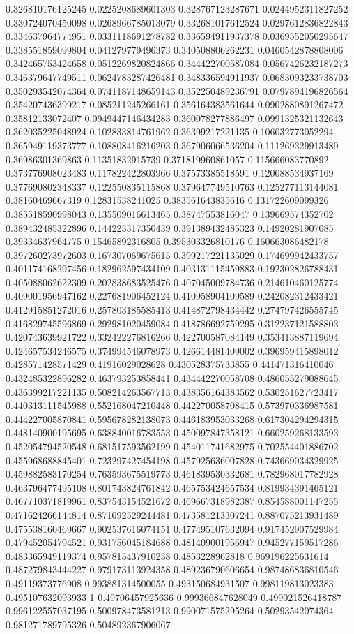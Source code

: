 \begin{table}
\begin{tabu}
\begin{sparkline}{10}
0.326810176125245 0.0225208689601303 0.328767123287671 0.0244952311827252 0.330724070450098 0.0268966785013079 0.332681017612524 0.0297612836822843 0.334637964774951 0.0331118691278782 0.336594911937378 0.0369552050295647 0.338551859099804 0.041279779496373 0.340508806262231 0.0460542878808006 0.342465753424658 0.0512269820824866 0.344422700587084 0.0567426232187273 0.346379647749511 0.0624783287426481 0.348336594911937 0.0683093233738703 0.350293542074364 0.0741187148659143 0.352250489236791 0.0797894196826564 0.354207436399217 0.085211245266161 0.356164383561644 0.0902880891267472 0.35812133072407 0.0949447146434283 0.360078277886497 0.0991325321132643 0.362035225048924 0.102833814761962 0.36399217221135 0.106032773052294 0.365949119373777 0.108808416216203 0.367906066536204 0.111269329913489 0.36986301369863 0.11351832915739 0.371819960861057 0.115666083770892 0.373776908023483 0.117822422803966 0.37573385518591 0.120088534937169 0.377690802348337 0.122550835115868 0.379647749510763 0.125277113144081 0.38160469667319 0.12831538241025 0.383561643835616 0.131722609099326 0.385518590998043 0.135509016613465 0.38747553816047 0.139669574352702 0.389432485322896 0.144223317350439 0.391389432485323 0.14920281907085 0.39334637964775 0.15465892316805 0.395303326810176 0.160663086482178 0.397260273972603 0.167307069675615 0.399217221135029 0.174699942433757 0.401174168297456 0.182962597434109 0.403131115459883 0.192302826788431 0.405088062622309 0.202838683525476 0.407045009784736 0.214610460125774 0.409001956947162 0.227681906452124 0.410958904109589 0.242082312433421 0.412915851272016 0.257803185585413 0.414872798434442 0.274797426555745 0.416829745596869 0.292981020459084 0.418786692759295 0.312237121588803 0.420743639921722 0.332422276816266 0.422700587084149 0.353413887119694 0.424657534246575 0.374994546078973 0.426614481409002 0.396959415898012 0.428571428571429 0.41916029028628 0.430528375733855 0.441471316410046 0.432485322896282 0.463793253858441 0.434442270058708 0.486055279088645 0.436399217221135 0.508214263567713 0.438356164383562 0.530251627723417 0.440313111545988 0.552168047210448 0.442270058708415 0.573970336987581 0.444227005870841 0.595678282138073 0.446183953033268 0.617304294294315 0.448140900195695 0.638840016783553 0.450097847358121 0.660259268133593 0.452054794520548 0.681517593562199 0.454011741682975 0.702554401886702 0.455968688845401 0.723297427454198 0.457925636007828 0.743669034329925 0.459882583170254 0.763593675519773 0.461839530332681 0.782968017782928 0.463796477495108 0.801743824761842 0.465753424657534 0.819934391465121 0.467710371819961 0.837543154521672 0.469667318982387 0.854588001147255 0.471624266144814 0.871092529244481 0.473581213307241 0.887075213931489 0.475538160469667 0.902537616074151 0.477495107632094 0.917452907529984 0.479452054794521 0.931756045184688 0.481409001956947 0.945277159517286 0.483365949119374 0.957815437910238 0.4853228962818 0.969196225631614 0.487279843444227 0.979173113924358 0.489236790606654 0.987486836810546 0.49119373776908 0.993881314500055 0.493150684931507 0.998119813023383 0.495107632093933 1 0.49706457925636 0.999366847628049 0.499021526418787 0.996122557037195 0.500978473581213 0.990071575295264 0.50293542074364 0.981271789795326 0.504892367906067 
\end{sparkline}
\end{tabu}
\end{table}
